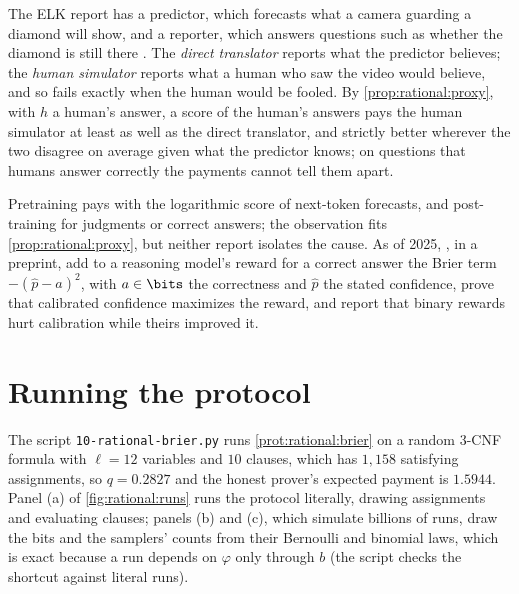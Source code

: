 \begin{refsection}
The ELK report has a predictor, which forecasts what a camera guarding a diamond will show, and a reporter, which answers questions such as whether the diamond is still there \parencite{ChristianoCotraXu2021}. The \emph{direct translator} reports what the predictor believes; the \emph{human simulator} reports what a human who saw the video would believe, and so fails exactly when the human would be fooled. By \cref{prop:rational:proxy}, with $h$ a human's answer, a score of the human's answers pays the human simulator at least as well as the direct translator, and strictly better wherever the two disagree on average given what the predictor knows; on questions that humans answer correctly the payments cannot tell them apart.


Pretraining pays with the logarithmic score of next-token forecasts, and post-training for judgments or correct answers; the observation fits \cref{prop:rational:proxy}, but neither report isolates the cause. As of 2025, \textcite{DamaniEtAl2025}, in a preprint, add to a reasoning model's reward for a correct answer the Brier term $-(\hat p-a)^2$, with $a\in\bits$ the correctness and $\hat p$ the stated confidence, prove that calibrated confidence maximizes the reward, and report that binary rewards hurt calibration while theirs improved it.

\section{Running the protocol}\label{sec:rational:running}

The script \texttt{10-rational-brier.py} runs \cref{prot:rational:brier} on a random 3-CNF formula with $\ell=12$ variables and $10$ clauses, which has $1{,}158$ satisfying assignments, so $q=0.2827$ and the honest prover's expected payment is $1.5944$. Panel (a) of \cref{fig:rational:runs} runs the protocol literally, drawing assignments and evaluating clauses; panels (b) and (c), which simulate billions of runs, draw the bits and the samplers' counts from their Bernoulli and binomial laws, which is exact because a run depends on $\varphi$ only through $b$ (the script checks the shortcut against literal runs).


\end{refsection}
